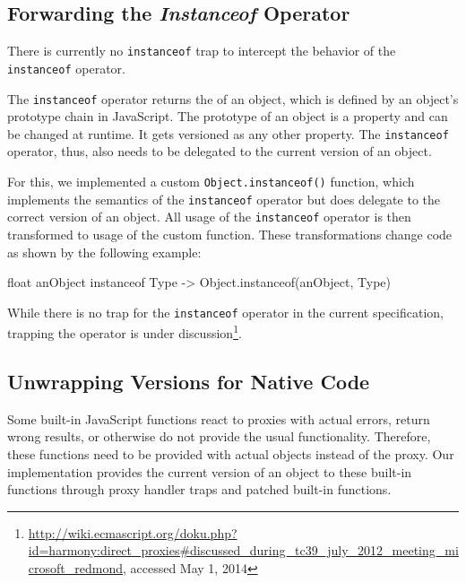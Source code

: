 \subsection{Forwarding the \emph{Instanceof} Operator}

There is currently no \lstinline{instanceof} trap to intercept the behavior of the \lstinline{instanceof} operator.

The \lstinline{instanceof} operator returns the of an object, which is defined by an object's prototype chain in JavaScript.
The prototype of an object is a property and can be changed at runtime.
It gets versioned as any other property.
The \lstinline{instanceof} operator, thus, also needs to be delegated to the current version of an object.

For this, we implemented a custom \lstinline{Object.instanceof()} function, which implements the semantics of the \lstinline{instanceof} operator but does delegate to the correct version of an object.
All usage of the \lstinline{instanceof} operator is then transformed to usage of the custom function.
These transformations change code as shown by the following example: 

\begin{code}[]{}{float}
anObject instanceof Type -> Object.instanceof(anObject, Type)
\end{code}
\iffalse
\end{verbatim}\fi

While there is no trap for the \lstinline{instanceof} operator in the current specification, trapping the operator is under discussion\footnote{\url{http://wiki.ecmascript.org/doku.php?id=harmony:direct_proxies\#discussed_during_tc39_july_2012_meeting_microsoft_redmond}, accessed May 1, 2014}.


\subsection{Unwrapping Versions for Native Code}

Some built-in JavaScript functions react to proxies with actual errors, return wrong results, or otherwise do not provide the usual functionality.
Therefore, these functions need to be provided with actual objects instead of the proxy.
Our implementation provides the current version of an object to these built-in functions through proxy handler traps and patched built-in functions.

